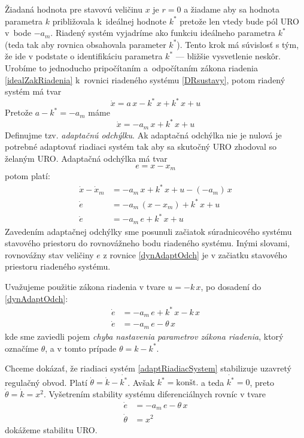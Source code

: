 \documentclass[a4paper, 10pt, ]{article}
\begin{document}
Žiadaná hodnota pre stavovú veličinu $x$ je $r = 0$ a žiadame aby sa hodnota parametra $k$ približovala k~ideálnej hodnote $k^*$ pretože len vtedy bude pól URO v~bode $-a_m$. Riadený systém vyjadríme ako funkciu ideálneho parametra $k^*$ (teda tak aby rovnica obsahovala parameter $k^*$). Tento krok má súvislosť s tým, že ide v podstate o identifikáciu parametra $k^*$ --- bližšie vysvetlenie neskôr.  Urobíme to jednoducho pripočítaním a~odpočítaním  zákona riadenia \eqref{idealZakRiadenia} k~rovnici riadeného systému \eqref{DRsustavy}, potom riadený systém má tvar
\begin{equation}
	\dot{x} = a\, x - k^*\, x + k^*\, x + u
\end{equation}
Pretože $a - k^* = -a_m$ máme
\begin{equation}
	\dot{x} = -a_m\, x + k^*\, x + u
\end{equation}
Definujme tzv. \emph{adaptačnú odchýlku}. Ak adaptačná odchýlka nie je nulová je potrebné adaptovať riadiaci systém tak aby sa skutočný URO zhodoval so želaným URO. Adaptačná odchýlka má tvar
\begin{equation}
	e = x - x_m
\end{equation}
potom platí:
\begin{subequations}
	\begin{align}
		\dot{x} - \dot{x}_m &= -a_m\, x + k^*\, x + u - (-a_m)\, x  \\
		\dot{e} &= -a_m\,(x - x_m) + k^*\, x + u \\
		\dot{e} &= -a_m\,e + k^*\, x + u   \label{dynAdaptOdch}
	\end{align}
\end{subequations}
Zavedením adaptačnej odchýlky sme posunuli začiatok súradnicového systému stavového priestoru do rovnovážneho bodu riadeného systému. Inými slovami, rovnovážny stav veličiny $e$ z rovnice \eqref{dynAdaptOdch} je v začiatku stavového priestoru riadeného systému.

Uvažujeme použitie zákona riadenia v tvare $u = -k\, x$, po dosadení do \eqref{dynAdaptOdch}:
\begin{align}
	\dot{e} &= -a_m\,e + k^*\, x  -k\, x \\
	\dot{e} &= -a_m\,e - \theta\, x
\end{align}
kde sme zaviedli pojem \emph{chyba nastavenia parametrov zákona riadenia}, ktorý označíme $\theta$, a v tomto prípade $\theta = k - k^*$.

Chceme dokázať, že riadiaci systém \eqref{adaptRiadiacSystem} stabilizuje uzavretý regulačný obvod. Platí $\dot{\theta} = \dot{k} - \dot{k^*}$. Avšak $k^* = \text{konšt.}$ a teda $\dot{k^*} = 0$, preto $\dot{\theta} = \dot{k} = x^2$. Vyšetrením stability systému diferenciálnych rovníc v tvare
\begin{subequations} \label{dynamikaAdaptOdch}
	\begin{align}
		\dot{e} &= -a_m\,e - \theta\, x  \\
		\dot{\theta} &= x^2
	\end{align}
\end{subequations}
dokážeme stabilitu URO.
\end{document}
